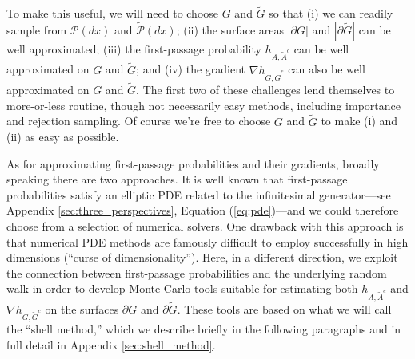 \documentclass[12pt, nofootinbib,english, amsmath, amssymb, aps, priprint, graphicx,floatfix]{revtex4-1}
\theoremstyle{plain}
\theoremstyle{definition}
\theoremstyle{plain}
\newcommand{\PMeasure}{\mathscr{P}(dx)}
\newcommand{\tPMeasure}{\tilde{\mathscr P}(dx)}
\begin{document}
To make this useful, we will need to choose $G$ and $\tilde{G}$ so that (i) we can readily sample from $\PMeasure$ and $\tPMeasure$; (ii) the surface areas $|\partial G|$ and
$|\partial\tilde{G}|$ can be well approximated; (iii) 
the first-passage probability $h_{A, \tilde{A}^c}$ can be well approximated on  $G$ and $\tilde{G}$; and (iv) the gradient
$\nabla h_{G, \tilde{G}^c}$ can also be well approximated on 
 $G$ and $\tilde{G}$. 
The first two of these challenges lend themselves to more-or-less routine, though not necessarily easy methods, including importance and rejection sampling. Of course we're free to choose $G$ and $\tilde G$ to make (i) and (ii) as easy as possible.

As for approximating first-passage probabilities and their gradients, broadly speaking there are two approaches. It is well known that first-passage probabilities satisfy an elliptic PDE related to the infinitesimal generator---see Appendix \ref{sec:three_perspectives}, Equation (\ref{eq:pde})---and we could therefore choose from a selection of numerical solvers. One drawback with this approach is that numerical PDE methods are famously difficult to employ successfully in high dimensions (``curse of dimensionality''). Here, in a different direction, we exploit the connection between first-passage probabilities and the underlying random walk in order to develop Monte Carlo tools suitable for estimating both $h_{A, \tilde{A}^c}$ and $\nabla h_{G, \tilde{G}^c}$ on the surfaces
$\partial G$ and $\partial\tilde{G}$. These tools are based on
what we will call the ``shell method,'' which we describe briefly in the following paragraphs and in full detail in Appendix \ref{sec:shell_method}.
\end{document}
